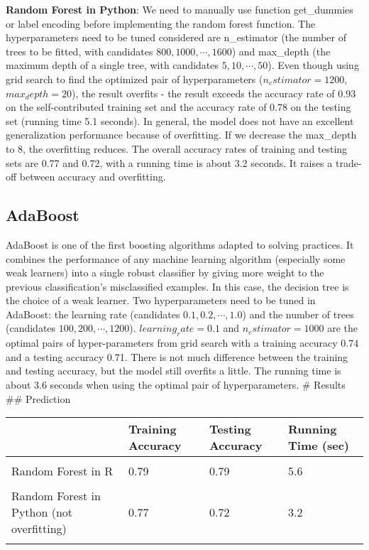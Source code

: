 \documentclass[11pt,]{article}
\begin{document}
\textbf{Random Forest in Python}: We need to manually use function
get\_dummies or label encoding before implementing the random forest
function. The hyperparameters need to be tuned considered are
n\_estimator (the number of trees to be fitted, with candidates
\(800,1000,\cdots, 1600\)) and max\_depth (the maximum depth of a single
tree, with candidates \(5,10,\cdots, 50\)). Even though using grid
search to find the optimized pair of hyperparameters
(\(n_estimator = 1200\), \(max_depth = 20\)), the result overfits - the
result exceeds the accuracy rate of 0.93 on the self-contributed
training set and the accuracy rate of 0.78 on the testing set (running
time 5.1 seconds). In general, the model does not have an excellent
generalization performance because of overfitting. If we decrease the
max\_depth to 8, the overfitting reduces. The overall accuracy rates of
training and testing sets are 0.77 and 0.72, with a running time is
about 3.2 seconds. It raises a trade-off between accuracy and
overfitting.

\hypertarget{adaboost}{%
\subsection{AdaBoost}\label{adaboost}}

AdaBoost is one of the first boosting algorithms adapted to solving
practices. It combines the performance of any machine learning algorithm
(especially some weak learners) into a single robust classifier by
giving more weight to the previous classification's misclassified
examples. In this case, the decision tree is the choice of a weak
learner. Two hyperparameters need to be tuned in AdaBoost: the learning
rate (candidates \(0.1,0.2,\cdots,1.0\)) and the number of trees
(candidates \(100,200,\cdots,1200\)). \(learning_rate = 0.1\) and
\(n_estimator = 1000\) are the optimal pairs of hyper-parameters from
grid search with a training accuracy 0.74 and a testing accuracy 0.71.
There is not much difference between the training and testing accuracy,
but the model still overfits a little. The running time is about 3.6
seconds when using the optimal pair of hyperparameters. \# Results \#\#
Prediction

\begin{table}[H]
\centering
\begin{tabular}{l|l|l|l}
\hline
  & Training Accuracy & Testing Accuracy & Running Time (sec)\\
\hline
\cellcolor{gray!6}{Logistic Regression} & \cellcolor{gray!6}{0.7} & \cellcolor{gray!6}{0.69} & \cellcolor{gray!6}{1.2}\\
\hline
Random Forest in R & 0.79 & 0.79 & 5.6\\
\hline
\cellcolor{gray!6}{Random Forest in Python (overfitting)} & \cellcolor{gray!6}{0.93} & \cellcolor{gray!6}{0.78} & \cellcolor{gray!6}{5.1}\\
\hline
Random Forest in Python (not overfitting) & 0.77 & 0.72 & 3.2\\
\hline
\cellcolor{gray!6}{Adaboost} & \cellcolor{gray!6}{0.74} & \cellcolor{gray!6}{0.71} & \cellcolor{gray!6}{3.6}\\
\hline
\end{tabular}
\end{table}
\end{document}

